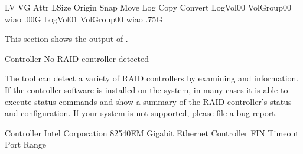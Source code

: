 \documentclass[letterpaper,10pt,english]{sphinxmanual}
\begin{document}
\begin{sphinxVerbatim}[commandchars=\\\{\}]
LV       VG         Attr   LSize   Origin Snap\PYGZpc{} Move Log Copy\PYGZpc{} Convert
LogVol00 VolGroup00 \PYGZhy{}wi\PYGZhy{}ao .00G
LogVol01 VolGroup00 \PYGZhy{}wi\PYGZhy{}ao   .75G
\end{sphinxVerbatim}

This section shows the output of .

\begin{sphinxVerbatim}[commandchars=\\\{\}]
  Controller  No RAID controller detected
\end{sphinxVerbatim}

The tool can detect a variety of RAID controllers by examining  and
 information. If the controller software is installed on the system, in
many cases it is able to execute status commands and show a summary of the RAID
controller’s status and configuration. If your system is not supported, please
file a bug report.

\begin{sphinxVerbatim}[commandchars=\\\{\}]
  Controller  Intel Corporation 82540EM Gigabit Ethernet Controller
 FIN Timeout  
  Port Range  
\end{sphinxVerbatim}
\end{document}
